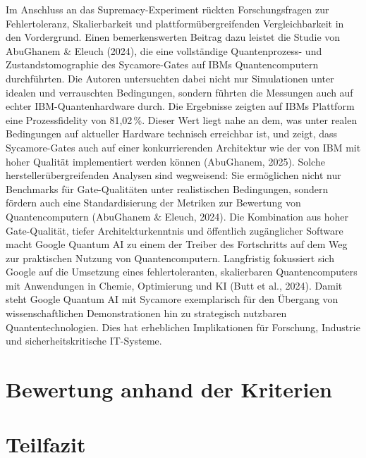 Im Anschluss an das Supremacy-Experiment rückten Forschungsfragen zur Fehlertoleranz, Skalierbarkeit und plattformübergreifenden Vergleichbarkeit in den Vordergrund. Einen bemerkenswerten Beitrag dazu leistet die Studie von AbuGhanem & Eleuch (2024), die eine vollständige Quantenprozess- und Zustandstomographie des Sycamore-Gates auf IBMs Quantencomputern durchführten. Die Autoren untersuchten dabei nicht nur Simulationen unter idealen und verrauschten Bedingungen, sondern führten die Messungen auch auf echter IBM-Quantenhardware durch. Die Ergebnisse zeigten auf IBMs Plattform eine Prozessfidelity von 81,02 \%. Dieser Wert liegt nahe an dem, was unter realen Bedingungen auf aktueller Hardware technisch erreichbar ist, und zeigt, dass Sycamore-Gates auch auf einer konkurrierenden Architektur wie der von IBM mit hoher Qualität implementiert werden können (AbuGhanem, 2025).
Solche herstellerübergreifenden Analysen sind wegweisend: Sie ermöglichen nicht nur Benchmarks für Gate-Qualitäten unter realistischen Bedingungen, sondern fördern auch eine Standardisierung der Metriken zur Bewertung von Quantencomputern (AbuGhanem & Eleuch, 2024). Die Kombination aus hoher Gate-Qualität, tiefer Architekturkenntnis und öffentlich zugänglicher Software macht Google Quantum AI zu einem der Treiber des Fortschritts auf dem Weg zur praktischen Nutzung von Quantencomputern. Langfristig fokussiert sich Google auf die Umsetzung eines fehlertoleranten, skalierbaren Quantencomputers mit Anwendungen in Chemie, Optimierung und KI (Butt et al., 2024).
Damit steht Google Quantum AI mit Sycamore exemplarisch für den Übergang von wissenschaftlichen Demonstrationen hin zu strategisch nutzbaren Quantentechnologien. Dies hat erheblichen Implikationen für Forschung, Industrie und sicherheitskritische IT-Systeme.


\section{Bewertung anhand der Kriterien}
\section{Teilfazit}


\printbibliography

